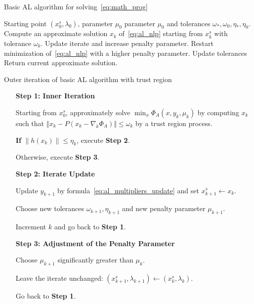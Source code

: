 \documentclass[10pt]{article}
\numberwithin{equation}{section}
\begin{document}
	 	\begin{algorithm}
	 		\caption{Basic AL algorithm for solving~\eqref{eq:math_prog}}\label{algo:basic_al}
	 		\begin{algorithmic}
	 			\Require Starting point $\left(x_0^s,\lambda_0\right)$, parameter $\mu_0$  parameter $\mu_0$ and tolerances $\omega_*,\omega_0,\eta_*,\eta_0$.
	 			\Repeat
	 			 \State Compute an approximate solution $x_{k}$ of~\eqref{eq:al_nlp} starting from \(x_k^s\) with tolerance $\omega_k$.
	 				\State Update iterate and increase penalty parameter.
	 				\Else
	 					\State Restart minimization of~\eqref{eq:al_nlp} with a higher penalty parameter.
	 			\EndIf
	 			\State Update tolerances
	 			\State Return current approximate solution.
	 		\end{algorithmic}
	 	\end{algorithm}
	 	
	 	\begin{algorithm}
	 	\caption{Outer iteration of basic AL algorithm with trust region}\label{algo:outer_basic_al_trm}
	 		\begin{enumerate}
	 		\item[\textbf{Step 1: Inner Iteration}]
	 		
	 		Starting from $x_0^s$, approximately solve $\min_x \Phi_A(x,y_k,\mu_k)$ by computing $x_k$ such that \(\left\Vert x_k - P(x_k-\nabla_k\Phi_A)\right\Vert \le \omega_k\)
	 		by a trust region process.
	 		
	 		\textbf{If} $\|h(x_k)\| \le \eta_k$, execute \textbf{Step 2}.
	 		
	 		Otherwise, execute \textbf{Step 3}.
	 		
	 		\item[\textbf{Step 2: Iterate Update}]
	 		
	 		Update $y_{k+1}$ by formula~\eqref{eq:al_multipliers_update} and set $x_{k+1}^s \gets x_k $.
	 		
	 		Choose new tolerances \(\omega_{k+1}, \eta_{k+1}\) and new penalty parameter \(\mu_{k+1}\).
	 		
	 		Increment $k$ and go back to \textbf{Step 1}.
	 		
	 		\item[\textbf{Step 3: Adjustment of the Penalty Parameter}] 
	 		
	 		Choose $\mu_{k+1}$ significantly greater than $\mu_k$.
	 		
	 		Leave the iterate unchanged: \(\left(x_{k+1}^s,\lambda_{k+1}\right) \gets \left(x_k^s,\lambda_k\right)\).
	 		
	 		Go back to \textbf{Step 1}.
	 	\end{enumerate}
	 \end{algorithm}
	 
\end{document}
